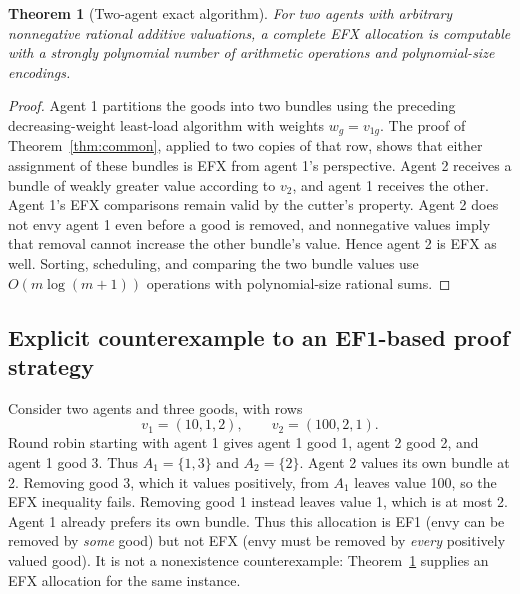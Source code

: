 \documentclass[11pt,a4paper]{article}
\newtheorem{theorem}{Theorem}[section]
\theoremstyle{definition}\newtheorem{definition}[theorem]{Definition}
\theoremstyle{remark}\newtheorem{remark}[theorem]{Remark}
\newcommand{\1}{\mathbf 1}
\begin{document}
\begin{theorem}[Two-agent exact algorithm]\label{thm:two}
For two agents with arbitrary nonnegative rational additive valuations, a complete EFX allocation is computable with a strongly polynomial number of arithmetic operations and polynomial-size encodings.
\end{theorem}
\begin{proof}
Agent 1 partitions the goods into two bundles using the preceding decreasing-weight least-load algorithm with weights $w_g=v_{1g}$. The proof of Theorem~\ref{thm:common}, applied to two copies of that row, shows that either assignment of these bundles is EFX from agent 1's perspective. Agent 2 receives a bundle of weakly greater value according to $v_2$, and agent 1 receives the other. Agent 1's EFX comparisons remain valid by the cutter's property. Agent 2 does not envy agent 1 even before a good is removed, and nonnegative values imply that removal cannot increase the other bundle's value. Hence agent 2 is EFX as well. Sorting, scheduling, and comparing the two bundle values use $O(m\log(m+1))$ operations with polynomial-size rational sums.
\end{proof}

\subsection{Explicit counterexample to an EF1-based proof strategy}
Consider two agents and three goods, with rows
\[
 v_1=(10,1,2),\qquad v_2=(100,2,1).
\]
Round robin starting with agent 1 gives agent 1 good 1, agent 2 good 2, and agent 1 good 3. Thus $A_1=\{1,3\}$ and $A_2=\{2\}$. Agent 2 values its own bundle at 2. Removing good 3, which it values positively, from $A_1$ leaves value 100, so the EFX inequality fails. Removing good 1 instead leaves value 1, which is at most 2. Agent 1 already prefers its own bundle. Thus this allocation is EF1 (envy can be removed by \emph{some} good) but not EFX (envy must be removed by \emph{every} positively valued good). It is not a nonexistence counterexample: Theorem~\ref{thm:two} supplies an EFX allocation for the same instance.
\end{document}
